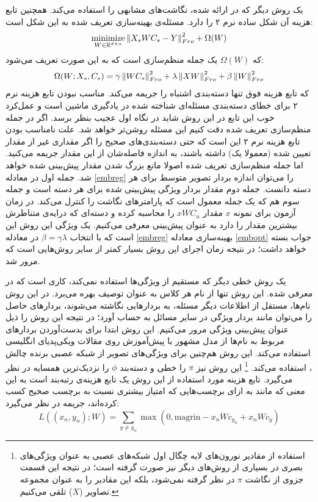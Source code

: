 یک روش دیگر که در \cite{ emb15} ارائه شده، نگاشت‌های مشابهی را استفاده می‌کند. همچنین تابع هزینه آن شکل ساده نرم ۲ را دارد. مسئله‌ی بهینه‌سازی تعریف شده به این شکل است:
\begin{equation} 
\operatorname*{minimize}_{W \in \mathbb{R}^{d \times a}} \left \lVert X_s WC_s-Y \right \rVert_{Fro}^2 + \Omega(W) \label{embopt}
\end{equation}
که $\Omega(W)$ یک جمله منظم‌سازی است که به این صورت تعریف می‌شود:
\begin{align}\label{embreg}
 \Omega(W;X_s, C_s) = \gamma \left \lVert WC_s \right \rVert_{Fro}^2 + \lambda \left \lVert XW \right \rVert_{Fro}^2 + \beta \left \lVert W \right \rVert_{Fro}^2 
\end{align}
که تابع هزینه فوق تنها دسته‌بندی اشتباه را جریمه می‌کند. مناسب نبودن تابع هزینه نرم ۲ برای خطای دسته‌بندی مسئله‌ای شناخته شده در یادگیری ماشین است و عمل‌کرد خوب این تابع در این روش شاید در نگاه اول عجیب بنظر برسد. اگر در جمله منظم‌سازی تعریف شده دقت کنیم این مسئله روشن‌تر خواهد شد. علت نامناسب بودن تابع هزینه نرم ۲ این است که حتی دسته‌بندی‌های صحیح را اگر مقداری غیر از مقدار تعیین شده (معمولا یک) داشته باشند، به اندازه فاصله‌شان از این مقدار جریمه می‌کنید. اما جمله منظم‌سازی تعریف شده اصولا مانع بزرگ شدن مقدار پیش‌بینی شده خواهد شد. جمله اول در معادله \eqref{embreg} را می‌توان اندازه بردار تصویر متوسط برای هر دسته دانست. جمله دوم مقدار بردار ویژگی پیش‌بینی شده برای هر دسته است و جمله سوم هم که یک جمله معمول است که پارامترهای نگاشت را کنترل می‌کند. در زمان آزمون برای نمونه $x$ مقدار $xWC_u$ را محاسبه کرده و دسته‌ای که درایه‌ی متناظرش بیشترین مقدار را دارد به عنوان پیش‌بینی معرفی می‌کنیم. یک ویژگی این روش این است که با انتخاب $ \beta = \gamma \lambda$ در معادله \eqref{embreg} بهینه‌سازی معادله \eqref{embopt} جواب بسته خواهد داشت؛ در نتیجه زمان اجرای این روش بسیار کمتر از سایر روش‌هایی است که مرور شد. 

یک روش خطی دیگر که مستقیم از ویژگی‌ها استفاده نمی‌کند، کاری است که در \cite{ devise} معرفی شده. این روش تنها از نام هر کلاس به عنوان توصیف بهره می‌برد. در این روش نام‌ها، مستقل از اطلاعات دیگر مسئله، به بردارهایی نگاشته می‌شوند، بردارهای حاصل را می‌توان مانند بردار ویژگی در سایر مسائل به حساب آورد؛ در نتیجه این روش را ذیل عنوان پیش‌بینی ویژگی مرور می‌کنیم. این روش ابتدا برای بدست‌آوردن بردارهای مربوط به نام‌ها از مدل مشهور 
  \cite{word2vec} 
با پیش‌آموزش روی مقالات ویکی‌پدیای انگلیسی استفاده می‌کند. این روش هم‌چنین برای ویژگی‌های تصویر از شبکه عصبی برنده چالش
،
استفاده می‌کند. \footnote{ استفاده از مقادیر نورون‌های لایه چگال اول شبکه‌های عصبی به عنوان ویژگی‌های بصری در بسیاری از روش‌های دیگر نیز صورت گرفته است؛ در نتیجه این قسمت جزوی از نگاشت $\pi$ در نظر گرفته نمی‌شود، بلکه این مقادیر را به عنوان مجموعه تصاویر ($X$) تلقی می‌کنیم. }
این روش نیز $\pi$ را خطی و دسته‌بند $\phi$ را نزدیک‌ترین همسایه در نظر می‌گیرد. تابع هزینه مورد استفاده از این روش یک تابع هزینه‌ی رتبه‌بند است به این معنی که مانند  \cite{ akata13} به ازای  برچسب‌هایی که امتیاز بیشتری نسبت به برچسب صحیح کسب کرده‌اند، جریمه در نظر می‌گیرد:
\begin{equation}
 L((x_n, y_n);W) = \sum_{y\neq y_n} \max(0, \text{magrin} - x_nWc_{y_n} + x_nWc_y) 
\end{equation}

